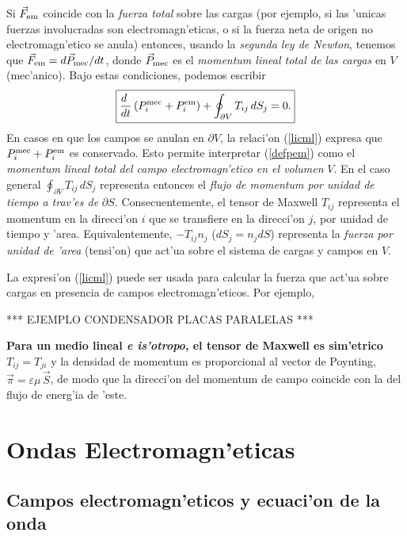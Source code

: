 Si $\vec{F}_{\rm em}$ coincide con la \textit{fuerza total} sobre las cargas (por ejemplo, si las 'unicas fuerzas involucradas son electromagn'eticas, o si la fuerza neta de origen no electromagn'etico se anula) entonces, usando la \textit{segunda ley de Newton}, tenemos que $\vec{F}_{\rm em}=d\vec{P}_{\rm mec}/dt$, donde $\vec{P}_{\rm mec}$ es el \textit{momentum lineal total de las cargas} en $V$ (mec'anico). Bajo estas condiciones, podemos escribir
\begin{equation}
\boxed{\frac{d\ }{dt}\left(P_i^{\rm mec}+P_i^{\rm em}\right)+\oint_{\partial
V}T_{ij}\,dS_j =0.} \label{licml}
\end{equation}
En casos en que los campos se anulan en $\partial V$, la relaci'on
(\ref{licml}) expresa que $P_i^{\rm mec}+P_i^{\rm em}$ es conservado. Esto
permite interpretar (\ref{defpem}) como el \textit{momentum lineal total del
campo electromagn'etico en el volumen} $V$. En el caso general $\oint_{\partial
V}T_{ij}\,dS_j $ representa entonces el \textit{flujo de momentum por unidad de tiempo
a trav'es de} $\partial S$. Consecuentemente, el tensor de Maxwell $T_{ij}$
representa el momentum en la direcci'on $i$ que se transfiere en la direcci'on
$j$, por unidad de tiempo y 'area. Equivalentemente, $-T_{ij}n_j$ ($dS_j=n_jdS$)
representa la \textit{fuerza por unidad de 'area} (tensi'on) que act'ua sobre el sistema
de cargas y campos en $V$.

La expresi'on (\ref{licml}) puede ser usada para calcular la fuerza que act'ua
sobre cargas en presencia de campos electromagn'eticos. Por ejemplo,

\begin{center}
*** EJEMPLO CONDENSADOR PLACAS PARALELAS ***
\end{center}

\textbf{Para un medio lineal \textit{e is'otropo}, el tensor de Maxwell es sim'etrico
$T_{ij}=T_{ji}$} y la densidad de momentum es proporcional al vector de
Poynting, $\vec{\pi}=\varepsilon\mu\,\vec{S}$, de modo que la direcci'on del
momentum de campo coincide con la del flujo de energ'ia de
'este.

\section{Ondas Electromagn'eticas}

\subsection{Campos electromagn'eticos y ecuaci'on de la onda}

